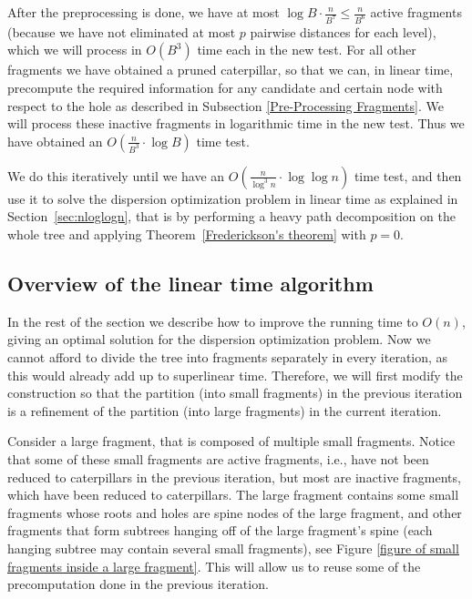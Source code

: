 \documentclass[a4paper,UKenglish]{lipics-v2016}
\theoremstyle{plain}
\begin{document}
After the preprocessing is done, we have at most $\log B \cdot \frac{n}{B^7}\leq \frac{n}{B^{6}}$ active fragments (because we have not eliminated at most $p$ pairwise distances for each level), which we will process in $O(B^{3})$
time each in the new test. For all other fragments we have obtained a pruned caterpillar, so that we can, in linear time, precompute the required information for any candidate and certain node with respect to the hole
as described in Subsection \ref{Pre-Processing Fragments}. We will process these inactive fragments in logarithmic time in the new test. Thus we have obtained an $O(\frac{n}{B^3} \cdot \log B)$ time test.

We do this iteratively until we have an $O(\frac{n}{\log ^3n} \cdot \log \log n)$ time test, and then use it to
solve the dispersion optimization problem in linear time as explained in Section~\ref{sec:nloglogn}, that is
by performing a heavy path decomposition on the whole tree and applying Theorem~\ref{Frederickson's theorem} with $p=0$.

\subsection{Overview of the linear time algorithm}
In the rest of the section we describe how to improve the running time to $O(n)$, giving an optimal solution for the dispersion optimization problem.
Now we cannot afford to divide the tree into fragments separately in every iteration, as this would already add up to superlinear time.
Therefore, we will first modify the construction so that the partition (into small fragments) in the previous iteration is a refinement of the partition
(into large fragments) in the current iteration.

Consider a large fragment, that is composed of multiple small fragments. Notice that some of these small fragments are active fragments, i.e., have not been reduced to caterpillars in the previous iteration, but most are inactive fragments, which have
been reduced to caterpillars. The large fragment contains some small fragments whose roots and holes are spine nodes of the large fragment,
and other fragments that form subtrees hanging off of the large fragment's spine (each hanging subtree may
contain several small fragments), see Figure \ref{figure of small fragments inside a large fragment}. This will allow us to
reuse some of the precomputation done in the previous iteration.
\end{document}
